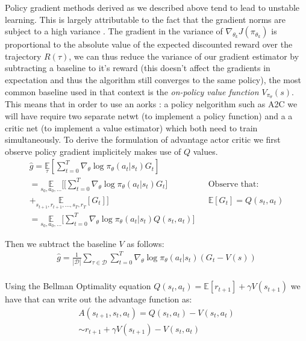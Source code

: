 Policy gradient methods derived as we described above tend to lead to unstable learning. 
This is largely attributable to the fact that the gradient norms are subject to a high variance \cite{Konda00actor-criticalgorithms}.
The gradient in the variance of $\nabla_{\theta_k} J(\pi_{\theta_k})$ is proportional to the absolute value of the expected discounted reward over the trajectory $R(\tau)$, we can thus reduce the variance of our gradient estimator by subtracting a baseline to it's reward (this doesn't affect the gradients in expectation and thus the algorithm still converges to the same policy), the most common baseline used in that context is the \textit{on-policy value function $V_{\pi_\theta}(s)$}. 
This means that in order to use an aorks : a policy nelgorithm such as A2C we will have require two separate netwt (to implement a policy function) and a a critic net (to implement a value estimator) which both need to train simultaneously. To derive the formulation of advantage actor critic we first observe policy gradient implicitely makes use of $Q$ values.\\

\begin{align*}
    \hat{g} = \underset{\tau}{\mathbb{E}} \left[ \sum_{t=0}^{T} \nabla_\theta \log \pi_\theta (a_t|s_t) G_t \right] && \text{}\\
    = \underset{s_0,a_0,...}{\mathbb{E}} \bigg[ \big[ \sum_{t=0}^{T} \nabla_\theta \log \pi_\theta (a_t|s_t) G_t \big] && \text{Observe that:}\\
    + \underset{s_{t+1},r_{t+1},...,s_{T},r_{T}}{\mathbb{E}} [G_t] \bigg] && \mathbb{E} [G_t] = Q(s_t,a_t)\\
    = \underset{s_0,a_0,...}{\mathbb{E}} \bigg[ \sum_{t=0}^{T} \nabla_\theta \log \pi_\theta (a_t|s_t) Q(s_t,a_t) \bigg] && 
\end{align*}

Then we subtract the baseline $V$ as follows:
\begin{align*}
    \hat{g} = \frac{1}{|\mathcal{D}|} \sum_{\tau \in \mathcal{D}} \sum_{t=0}^{T} \nabla_\theta \log \pi_\theta (a_t|s_t) (G_t-V(s))\\
\end{align*}

Using the Bellman Optimality equation $Q(s_t,a_t) = \mathbb{E}[r_{t+1}] + \gamma V(s_{t+1})$ we have that can write out the advantage function as:
\begin{align*}
    A(s_{t+1},s_t,a_t) = Q(s_t,a_t) - V(s_t,a_t) \\
   \sim r_{t+1} + \gamma V(s_{t+1}) - V(s_t,a_t) 
\end{align*}

